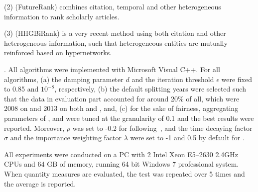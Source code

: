 \noindent
(2) \futurerank (FutureRank) combines citation, temporal and other heterogeneous information to rank scholarly articles.

\noindent
(3) \hhgrank (HHGBiRank) is a very recent method using both citation and other heterogeneous information, such that heterogeneous entities are mutually reinforced based on hypernetworks.


.
All algorithms were implemented with Microsoft Visual C++.
For all algorithms, (a) the damping parameter $d$ and the iteration threshold $\epsilon$ were fixed to 0.85 and $10^{-8}$, respectively,
(b) the default splitting years were selected such that the data in evaluation part accounted for around 20\% of all, which were 2008 on \aan and 2013 on both \aminer and \magdata, and,
(c) for the sake of fairness, aggregating parameters of \futurerank, \hhgrank and \ensemblerank were tuned at the granularity of 0.1 and the best results were reported.
%
Moreover, $\rho$ was set to -0.2 for \futurerank following~\cite{sayyadi09}, and the time decaying factor $\sigma$ and the importance weighting factor $\lambda$ were set to -1 and 0.5  by default for \ensemblerank.

All experiments were conducted on a PC with 2 Intel Xeon E5--2630 2.4GHz CPUs and 64 GB of memory, running 64 bit Windows 7 professional system. %
When quantity measures are evaluated, the test was repeated over 5 times and the average is reported.


